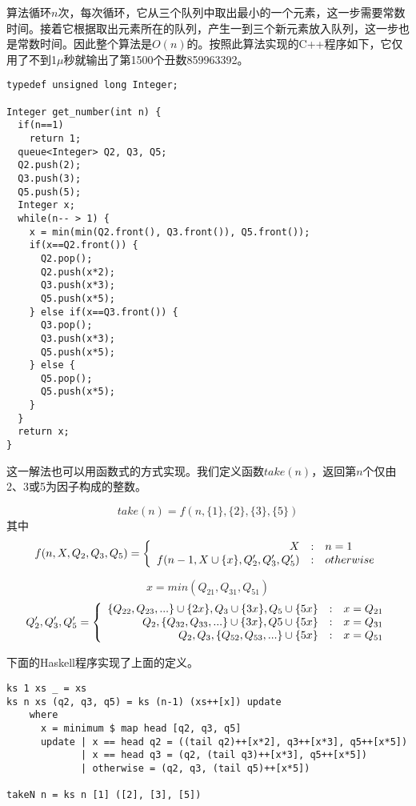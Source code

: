 \documentclass[UTF8]{article}
\begin{document}
算法循环$n$次，每次循环，它从三个队列中取出最小的一个元素，这一步需要常数时间。接着它根据取出元素所在的队列，产生一到三个新元素放入队列，这一步也是常数时间。因此整个算法是$O(n)$的。按照此算法实现的C++程序如下，它仅用了不到1$\mu$秒就输出了第1500个丑数859963392。

\lstset{language=C++}
\begin{lstlisting}
typedef unsigned long Integer;

Integer get_number(int n) {
  if(n==1)
    return 1;
  queue<Integer> Q2, Q3, Q5;
  Q2.push(2);
  Q3.push(3);
  Q5.push(5);
  Integer x;
  while(n-- > 1) {
    x = min(min(Q2.front(), Q3.front()), Q5.front());
    if(x==Q2.front()) {
      Q2.pop();
      Q2.push(x*2);
      Q3.push(x*3);
      Q5.push(x*5);
    } else if(x==Q3.front()) {
      Q3.pop();
      Q3.push(x*3);
      Q5.push(x*5);
    } else {
      Q5.pop();
      Q5.push(x*5);
    }
  }
  return x;
}
\end{lstlisting}

这一解法也可以用函数式的方式实现。我们定义函数$take(n)$，返回第$n$个仅由2、3或5为因子构成的整数。

\[
  take(n) = f(n, \{1\}, \{2\}, \{3\}, \{5\})
\]
其中
\[
 f(n, X, Q_2, Q_3, Q_5) = \left \{
  \begin{array}{r@{\quad:\quad}l}
  X & n = 1 \\
  f(n-1, X \cup \{x\}, Q_2', Q_3', Q_5') & otherwise
  \end{array}
\right.
\]

\[
 x = min(Q_{21}, Q_{31}, Q_{51})
\]
\[
 Q_2', Q_3', Q_5' = \left \{
 \begin{array}{r@{\quad:\quad}l}
 \{Q_{22}, Q_{23}, ...\} \cup \{2x\}, Q_3 \cup \{3x\}, Q_5 \cup \{5x\} & x = Q_{21} \\
 Q_2, \{Q_{32}, Q_{33}, ...\} \cup \{3x\}, Q5 \cup \{5x\} & x = Q_{31} \\
 Q_2, Q_3, \{Q_{52}, Q_{53}, ...\} \cup \{5x\} & x = Q_{51}
 \end{array}
 \right.
\]

下面的Haskell程序实现了上面的定义。

\begin{lstlisting}[style=Haskell]
ks 1 xs _ = xs
ks n xs (q2, q3, q5) = ks (n-1) (xs++[x]) update
    where
      x = minimum $ map head [q2, q3, q5]
      update | x == head q2 = ((tail q2)++[x*2], q3++[x*3], q5++[x*5])
             | x == head q3 = (q2, (tail q3)++[x*3], q5++[x*5])
             | otherwise = (q2, q3, (tail q5)++[x*5])

takeN n = ks n [1] ([2], [3], [5])
\end{lstlisting} %
\end{document}
